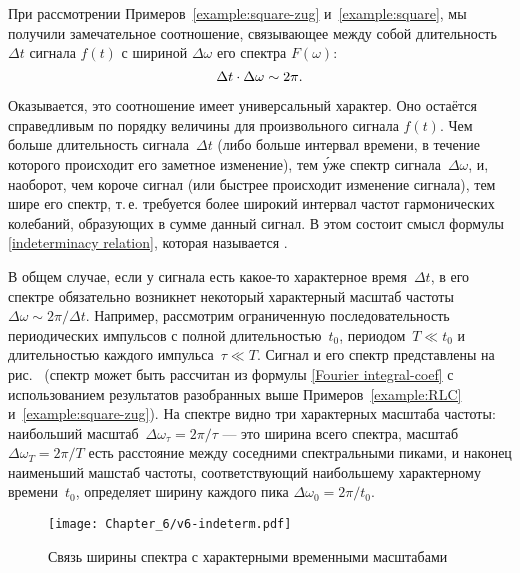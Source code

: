 При рассмотрении Примеров~\ref{example:square-zug} и~\ref{example:square},
мы получили замечательное соотношение, связывающее между собой
длительность~$\Delta t$ сигнала $f(t)$ с шириной $\Delta \omega$ его спектра
$F(\omega)$:
\begin{equation}
    \eqmark{indeterminacy relation}
    \Delta t \cdot \Delta\omega \sim 2\pi.
\end{equation}

Оказывается, это соотношение имеет универсальный характер.
Оно остаётся справедливым по порядку величины для произвольного сигнала $f(t)$.
Чем больше длительность сигнала~$\Delta t$ (либо больше интервал времени,
в течение которого происходит его заметное изменение), тем \'{у}же спектр
сигнала~$\Delta\omega$, и, наоборот, чем короче сигнал (или быстрее происходит
изменение сигнала), тем шире его спектр, т.\,е. требуется более широкий интервал
частот гармонических колебаний, образующих в сумме данный сигнал.
В этом состоит смысл формулы \eqref{indeterminacy relation},
которая называется .

В общем случае, если у сигнала есть какое-то характерное время~$\Delta t$,
в его спектре обязательно возникнет некоторый характерный масштаб
частоты $\Delta \omega \sim 2\pi / \Delta t$. Например, рассмотрим ограниченную
последовательность периодических импульсов с полной длительностью~$t_0$,
периодом~$T\ll t_0$ и длительностью каждого импульса~$\tau\ll T$.
Сигнал и его спектр представлены на рис.~
(спектр может быть рассчитан из формулы \eqref{Fourier integral-coef}
с использованием результатов разобранных выше Примеров~\ref{example:RLC}
и~\ref{example:square-zug}). На спектре видно три характерных масштаба частоты:
наибольший масштаб~$\Delta \omega_{\tau} = 2\pi/\tau$ --- это ширина всего спектра,
масштаб~$\Delta \omega_T = 2\pi / T$ есть расстояние между соседними
спектральными пиками, и наконец наименьший машстаб частоты,
соответствующий наибольшему характерному времени~$t_0$, 
определяет ширину каждого пика $\Delta \omega_0 = 2\pi /t_0$.


\begin{figure}[h!]
\centering\texttt{[image: Chapter\_6/v6-indeterm.pdf]}
\caption{Связь ширины спектра с характерными временными масштабами}
\end{figure}


